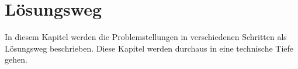 \section{Lösungsweg} \label{sec:projektbericht-loesungsweg}

In diesem Kapitel werden die Problemstellungen in verschiedenen Schritten als Lösungsweg beschrieben.
Diese Kapitel werden durchaus in eine technische Tiefe gehen.






